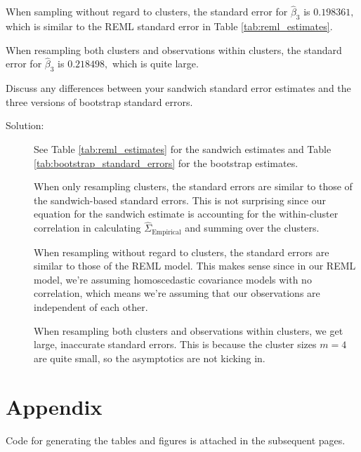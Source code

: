 \documentclass[11pt, letterpaper]{article}
\begin{document}
\begin{enumerate}[(a)]
\begin{description}
  When sampling without regard to clusters, the standard error for
  $\hat{\beta}_3$ is $\boxed{0.198361,}$ which is similar to the REML standard
  error in Table \ref{tab:reml_estimates}.

  When resampling both clusters and observations within clusters, the standard
  error for $\hat{\beta}_3$ is $\boxed{0.218498,}$ which is quite large.
\end{description}

{\em \item Discuss any differences between your sandwich standard
  error estimates and the three versions of bootstrap standard errors.}

\begin{description}
\item[Solution:] See Table \ref{tab:reml_estimates} for the sandwich estimates
  and Table \ref{tab:bootstrap_standard_errors} for the bootstrap estimates.

  When only resampling clusters, the standard errors are similar to those of the
  sandwich-based standard errors. This is not surprising since our equation for
  the sandwich estimate is accounting for the within-cluster correlation in
  calculating $\hat{\Sigma}_\text{Empirical}$ and summing over the clusters.

  When resampling without regard to clusters, the standard errors are similar to
  those of the REML model. This makes sense since in our REML model, we're
  assuming homoscedastic covariance models with no correlation, which means
  we're assuming that our observations are independent of each other.

  When resampling both clusters and observations within clusters, we get large,
  inaccurate standard errors. This is because the cluster sizes $m = 4$ are
  quite small, so the asymptotics are not kicking in.
\end{description}
\end{enumerate}

\section*{Appendix}

Code for generating the tables and figures is attached in the subsequent pages.


\end{document}
